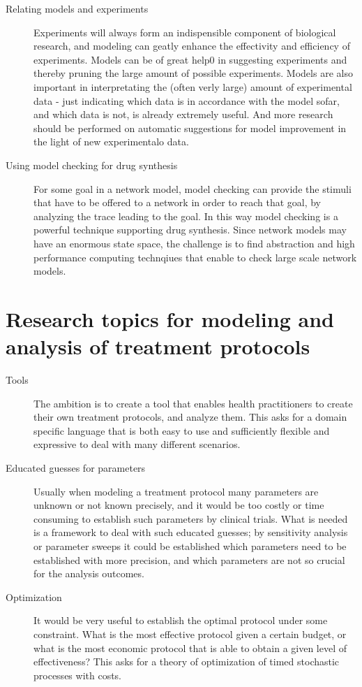 \documentclass[sigplan,10pt]{acmart}\settopmatter{printfolios=true,printccs=false,printacmref=false}
\begin{document}
\begin{description}
\item[Relating models and experiments] Experiments will always form an
indispensible component of biological research, and modeling can geatly enhance
the effectivity and efficiency of experiments. Models can be of great help0 in
suggesting experiments and thereby pruning the large amount of possible
experiments. Models are also important in interpretating the (often verly
large) amount of experimental data - just indicating which data is in
accordance with the model sofar, and which data is not, is already extremely
useful. And more research should be performed on automatic suggestions for
model improvement in the light of new experimentalo data.

\item[Using model checking for drug synthesis] For some goal in a network model,
model
checking can provide the stimuli that have to be offered to a network in order
to reach that goal, by analyzing the trace leading to the goal.
In this way model checking is a powerful technique supporting drug synthesis.
Since network
models may have an enormous state space, the challenge is to find abstraction
and high performance computing technqiues that enable to check large scale
network models.


\end{description}

\section{Research topics for modeling and analysis of treatment protocols}


\begin{description}
\item[Tools] The ambition is to create a tool that enables health practitioners
to create their own treatment protocols, and analyze them. This asks for a
domain specific language that is both easy to use and sufficiently flexible and
expressive to deal with many different scenarios.

\item[Educated guesses for parameters] Usually when modeling a treatment
protocol many parameters are unknown or not known precisely, and it would be
too costly or time consuming to establish such parameters by clinical trials.
What is needed is a framework to deal with such educated guesses; by sensitivity
analysis or parameter sweeps it could be established which parameters need to
be established with more precision, and which parameters are not so crucial for
the analysis outcomes.


\item[Optimization] It would be very useful to establish the optimal protocol
under
some constraint. What is the most effective protocol given a certain budget, or
what is the most economic protocol that is able to obtain a given level of
effectiveness? This asks for a theory of optimization of timed stochastic
processes with costs.

\end{description}



\end{document}
